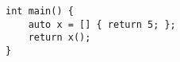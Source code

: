 \begin{lstlisting}[title=\href{https://godbolt.org/z/DrnSSE}{\texttt{godbolt.org/z/DrnSSE}}]
int main() {
    auto x = [] { return 5; };
    return x();
}
\end{lstlisting}
